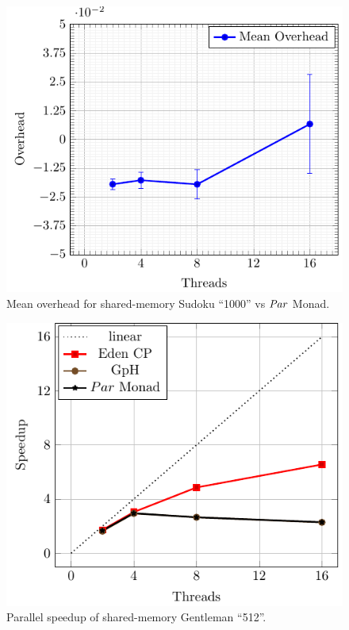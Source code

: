 \documentclass[paper=A4,twoside=true,openright,parskip=full,chapterprefix=true,headings=normal,bibliography=totoc,listof=totoc,titlepage=on,captions=tableabove,draft=false,british]{scrreprt}%
\renewcommand{\enquote}[1]{{``}#1{''}}
\begin{document}
\begin{figure}
\centering
\includegraphics{src/img/overSMSudokuPar.pdf}
\caption{Mean overhead for shared-memory Sudoku \enquote{1000} vs \ensuremath{\Conid{Par}}
Monad.\label{fig:overSMSudokuPar}}
\end{figure}

\begin{figure}
\centering
\includegraphics{src/img/perfSMTorus.pdf}
\caption{Parallel speedup of shared-memory Gentleman
\enquote{512}.\label{fig:perfSMTorus}}
\end{figure}
\end{document}
